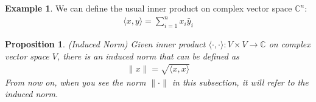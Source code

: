 \documentclass[12pt]{article}
\numberwithin{equation}{section} %
\theoremstyle{plain}
\newtheorem{prop}[thm]{Proposition}
\theoremstyle{definition}
\newtheorem{ex}[thm]{Example}
\theoremstyle{remark}
\newcommand{\ra}{\rightarrow}
\newcommand{\C}{\mathbb{C}}
\newcommand{\Cn}{\mathbb{C}^n}
\begin{document}
\begin{ex}
We can define the usual inner product on complex vector space $\Cn$:
\begin{align*}
  \langle x,y\rangle = \sum_{i=1}^n x_i \bar{y}_i
\end{align*}
\end{ex}

\begin{prop}\emph{(Induced Norm)}
Given inner product $\langle \cdot, \cdot \rangle: V\times V \ra \C$ on
complex vector space $V$, there is an \emph{induced norm} that can be
defined as
\begin{align*}
  \lVert x\rVert = \sqrt{\langle x, x\rangle}
\end{align*}
From now on, when you see the norm $\lVert \cdot \rVert$ in this
subsection, it will refer to the induced norm.
\end{prop}
\end{document}
